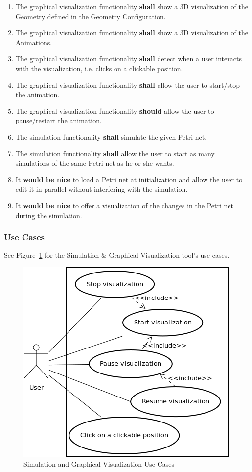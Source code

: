 \begin{enumerate}
  \item The graphical visualization functionality \textbf{shall} show a 3D visualization of the Geometry defined in the Geometry Configuration.
  \item The graphical visualization functionality \textbf{shall} show a 3D visualization of the Animations.
  \item The graphical visualization functionality \textbf{shall} detect when a user interacts with the visualization, i.e. clicks on a clickable position.
  \item The graphical visualization functionality \textbf{shall} allow the user to start/stop the animation.
  \item The graphical visualization functionality \textbf{should} allow the user to pause/restart the animation.
  \item The simulation functionality \textbf{shall} simulate the given Petri net.
  \item The simulation functionality \textbf{shall} allow the user to start as many simulations of the same Petri net as he or she wants.  
  \item It \textbf{would be nice} to load a Petri net at initialization and allow the user to edit it in parallel without interfering with the simulation.
  \item It \textbf{would be nice} to offer a visualization of the changes in the Petri net during the simulation.
\end{enumerate}

\subsubsection{Use Cases}

See Figure~\ref{fig:simulation_use_cases} for the Simulation \& Graphical Visualization tool's use cases.

\begin{figure}[htp]
\begin{center}
  \includegraphics[scale=0.5]{image/uc_visualization.png}
  \caption{Simulation and Graphical Visualization Use Cases}
  \label{fig:simulation_use_cases}
\end{center}
\end{figure}


